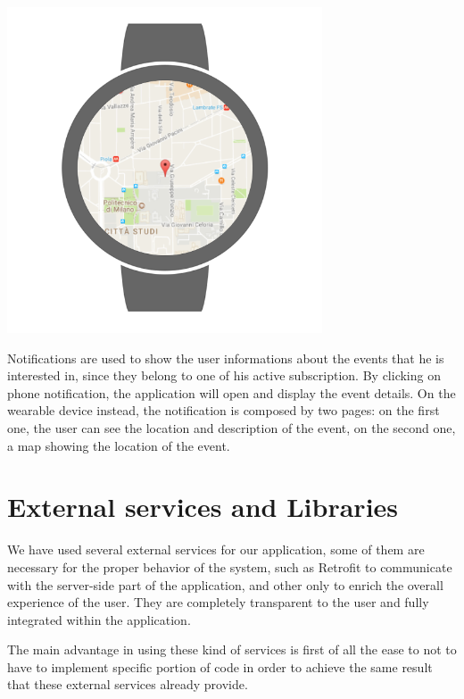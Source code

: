 \documentclass[a4paper]{scrreprt}
\begin{document}
\begin{minipage}{0.33\textwidth}
	\centering
	\includegraphics[width=0.7\textwidth]{imgs/notification_wear_map.png}
\end{minipage}
\par\bigskip
Notifications are used to show the user informations about the events that he is interested in, since they belong to one of his active subscription. By clicking on phone notification, the application will open and display the event details. On the wearable device instead, the notification is composed by two pages: on the first one, the user can see the location and description of the event, on the second one, a map showing the location of the event.

\chapter{External services and Libraries}
We have used several external services for our application, some of them are necessary for the proper behavior of the system, such as Retrofit to communicate with the server-side part of the application, and other only to enrich the overall experience of the user. They are completely transparent to the user and fully integrated within the application.

The main advantage in using these kind of services is first of all the ease to not to have to implement specific portion of code in order to achieve the same result that these external services already provide.
\end{document}
